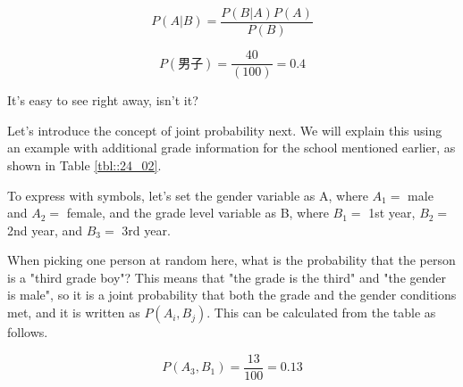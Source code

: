 \documentclass{ltjsbook}
\begin{document}
\[ P(A|B) = \frac{P(B|A)P(A)}{P(B)} \]



\[P(\mbox{男子})=\frac{40}{(100)}=0.4 \]

It's easy to see right away, isn't it?

Let's introduce the concept of joint probability next. We will explain this using an example with additional grade information for the school mentioned earlier, as shown in Table \ref{tbl::24_02}.



To express with symbols, let's set the gender variable as A, where $A_1=$ male and $A_2=$ female, and the grade level variable as B, where $B_1=$ 1st year, $B_2=$ 2nd year, and $B_3=$ 3rd year.

When picking one person at random here, what is the probability that the person is a "third grade boy"? This means that "the grade is the third" and "the gender is male", so it is a joint probability that both the grade and the gender conditions met, and it is written as $P(A_i,B_j)$. This can be calculated from the table as follows.

\[ P(A_3,B_1)= \frac{13}{100}=0.13 \]

\end{document}
